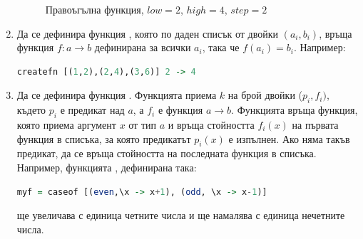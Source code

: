 \begin{enumerate}[]
\begin{figure}

      \caption{Правоъгълна функция, $low=2$, $high=4$, $step=2$}
      \label{fig:rectfn}
    \end{figure}

	\item   Да се дефинира функция , която по даден списък от двойки $(a_i,b_i)$, връща функция $f:a \rightarrow b$ дефинирана за всички $a_i$, така че $f(a_i)=b_i$. Например:

\begin{lstlisting}[basicstyle=\small,language=Haskell]
createfn [(1,2),(2,4),(3,6)] 2 -> 4
\end{lstlisting}


	\item Да се дефинира функция . Функцията приема $k$ на брой двойки ($p_i,f_i)$, където $p_i$ е предикат над $a$, а $f_i$ е функция $a \rightarrow b$. Функцията  връща функция, която приема аргумент $x$ от тип $a$ и връща стойността $f_i(x)$ на първата функция в списъка, за която предикатът $p_i(x)$ е изпълнен. Ако няма такъв предикат, да се връща стойността на последната функция в списъка. Например, функцията , дефинирана така:
\begin{lstlisting}[basicstyle=\small,language=Haskell]
myf = caseof [(even,\x -> x+1), (odd, \x -> x-1)]
\end{lstlisting}
	ще увеличава с единица четните числа и ще намалява с единица нечетните числа.
		

\end{enumerate}
